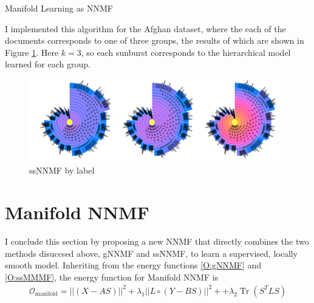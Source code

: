 \documentclass[12pt]{pom_thesis}
\begin{document}
\begin{chapter}{Manifold Learning as NNMF}
	\begin{algorithm}[H]
		\caption{Multiplicative Update for Semi-Supervised NNMF}
	\end{algorithm}
	I implemented this algorithm for the Afghan dataset, where the each of the documents corresponds to one of three groups, the results of which are shown in Figure \ref{fig:semi}. Here $k=3$, so each sunburst corresponds to the hierarchical model learned for each group. 
	\begin{figure}
		\label{fig:semi}
		\centering
		\includegraphics[width=7in]{semi-viz}
		\caption{ssNNMF by label}
	\end{figure}
	
	\section{Manifold NNMF}
	I conclude this section by proposing a new NNMF that directly  combines the two methods disuccsed above, gNNMF and ssNNMF, to learn a supervised, locally smooth model. Inheriting from the energy functions \ref{O:gNNMF} and \ref{O:ssMMMF}, the energy function for Manifold NNMF is
	\begin{align}
	\mathcal{O}_{\text{manifold}} =  ||(X-AS)||^2 + \lambda_1 ||L \circ (Y-BS)||^2 +  + \lambda_2 \operatorname{Tr}(S^TLS)
	\end{align}
\end{chapter}
\end{document}
